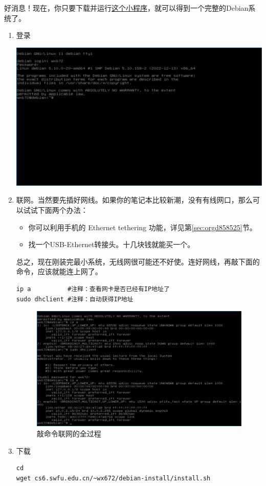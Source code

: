 \documentclass{wx672ctexart} \usepackage{hyperref}
\begin{document}
好消息！现在，你只要下载并运行\href{https://cs6.swfu.edu.cn/\~wx672/debian-install/install.sh}{这个小程序}，就可以得到一个完整的Debian系统了。
\begin{enumerate}
\item 登录

\begin{center}
\includegraphics[width=.5\linewidth]{screenshots/33.png}
\end{center}

\item 联网。当然要先插好网线。如果你的笔记本比较新潮，没有有线网口，那么可以试试下面两个办法：
\begin{itemize}
\item 你可以利用手机的 Ethernet tethering 功能，详见第\ref{sec:orgd858525}节。
\item 找一个USB-Ethernet转接头。十几块钱就能买一个。
\end{itemize}

总之，现在刚装完最小系统，无线网很可能还不好使。连好网线，再敲下面的命令，应该就能连上网了。

\begin{verbatim}
ip a          #注释：查看网卡是否已经有IP地址了
sudo dhclient #注释：自动获得IP地址
\end{verbatim}

\begin{figure}[htbp]
\centering
\includegraphics[width=.5\linewidth]{screenshots/36.png}
\caption{敲命令联网的全过程}
\end{figure}

\item 下载

\begin{verbatim}
cd
wget cs6.swfu.edu.cn/~wx672/debian-install/install.sh
\end{verbatim}


\end{enumerate}
\end{document}

